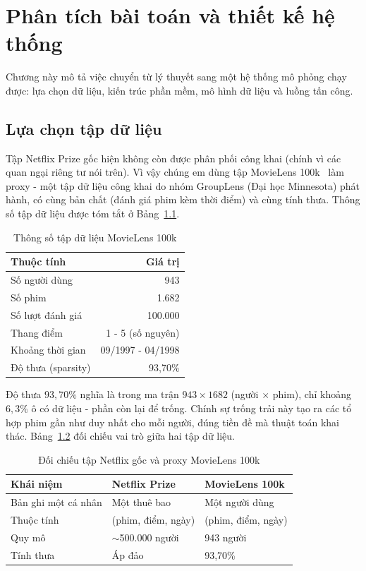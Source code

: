 \chapter{Phân tích bài toán và thiết kế hệ thống}
\label{chap:design}

Chương này mô tả việc chuyển từ lý thuyết sang một hệ thống mô phỏng chạy được: lựa chọn dữ liệu, kiến trúc phần mềm, mô hình dữ liệu và luồng tấn công.

\section{Lựa chọn tập dữ liệu}

Tập Netflix Prize gốc hiện không còn được phân phối công khai (chính vì các quan ngại riêng tư nói trên). Vì vậy chúng em dùng tập MovieLens 100k~\cite{movielens} làm proxy - một tập dữ liệu công khai do nhóm GroupLens (Đại học Minnesota) phát hành, có cùng bản chất (đánh giá phim kèm thời điểm) và cùng tính thưa. Thông số tập dữ liệu được tóm tắt ở Bảng~\ref{tab:dataset}.

\begin{table}[!htb]
\centering
\caption{Thông số tập dữ liệu MovieLens 100k}
\label{tab:dataset}
\renewcommand{\arraystretch}{1.3}
\begin{tabularx}{0.8\linewidth}{X r}
\toprule
\textbf{Thuộc tính} & \textbf{Giá trị} \\
\midrule
Số người dùng & 943 \\
Số phim & 1.682 \\
Số lượt đánh giá & 100.000 \\
Thang điểm & 1 - 5 (số nguyên) \\
Khoảng thời gian & 09/1997 - 04/1998 \\
Độ thưa (sparsity) & 93{,}70\% \\
\bottomrule
\end{tabularx}
\end{table}

Độ thưa $93{,}70\%$ nghĩa là trong ma trận $943 \times 1682$ (người $\times$ phim), chỉ khoảng $6{,}3\%$ ô có dữ liệu - phần còn lại để trống. Chính sự trống trải này tạo ra các tổ hợp phim gần như duy nhất cho mỗi người, đúng tiền đề mà thuật toán khai thác. Bảng~\ref{tab:mapping} đối chiếu vai trò giữa hai tập dữ liệu.

\begin{table}[!htb]
\centering
\caption{Đối chiếu tập Netflix gốc và proxy MovieLens 100k}
\label{tab:mapping}
\renewcommand{\arraystretch}{1.3}
\begin{tabularx}{\linewidth}{p{4.2cm} X X}
\toprule
\textbf{Khái niệm} & \textbf{Netflix Prize} & \textbf{MovieLens 100k} \\
\midrule
Bản ghi một cá nhân & Một thuê bao & Một người dùng \\
Thuộc tính & (phim, điểm, ngày) & (phim, điểm, ngày) \\
Quy mô & $\sim$500.000 người & 943 người \\
Tính thưa & Áp đảo & 93{,}70\% \\
\bottomrule
\end{tabularx}
\end{table}

